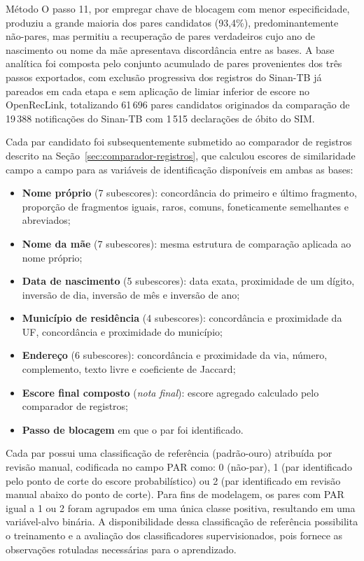 \begin{chapter}{Método}
O passo 11, por empregar chave de blocagem com menor especificidade, produziu a grande maioria dos pares candidatos (93,4\%), predominantemente não-pares, mas permitiu a recuperação de pares verdadeiros cujo ano de nascimento ou nome da mãe apresentava discordância entre as bases. A base analítica foi composta pelo conjunto acumulado de pares provenientes dos três passos exportados, com exclusão progressiva dos registros do Sinan-TB já pareados em cada etapa e sem aplicação de limiar inferior de escore no OpenRecLink, totalizando 61\,696 pares candidatos originados da comparação de 19\,388 notificações do Sinan-TB com 1\,515 declarações de óbito do SIM.

Cada par candidato foi subsequentemente submetido ao comparador de registros descrito na Seção~\ref{sec:comparador-registros}, que calculou escores de similaridade campo a campo para as variáveis de identificação disponíveis em ambas as bases:

\begin{itemize}
\item \textbf{Nome próprio} (7 subescores): concordância do primeiro e último fragmento, proporção de fragmentos iguais, raros, comuns, foneticamente semelhantes e abreviados;
\item \textbf{Nome da mãe} (7 subescores): mesma estrutura de comparação aplicada ao nome próprio;
\item \textbf{Data de nascimento} (5 subescores): data exata, proximidade de um dígito, inversão de dia, inversão de mês e inversão de ano;
\item \textbf{Município de residência} (4 subescores): concordância e proximidade da UF, concordância e proximidade do município;
\item \textbf{Endereço} (6 subescores): concordância e proximidade da via, número, complemento, texto livre e coeficiente de Jaccard;
\item \textbf{Escore final composto} (\textit{nota final}): escore agregado calculado pelo comparador de registros;
\item \textbf{Passo de blocagem} em que o par foi identificado.
\end{itemize}

Cada par possui uma classificação de referência (padrão-ouro) atribuída por revisão manual, codificada no campo PAR como: 0 (não-par), 1 (par identificado pelo ponto de corte do escore probabilístico) ou 2 (par identificado em revisão manual abaixo do ponto de corte). Para fins de modelagem, os pares com PAR igual a 1 ou 2 foram agrupados em uma única classe positiva, resultando em uma variável-alvo binária. A disponibilidade dessa classificação de referência possibilita o treinamento e a avaliação dos classificadores supervisionados, pois fornece as observações rotuladas necessárias para o aprendizado.


\end{chapter}
